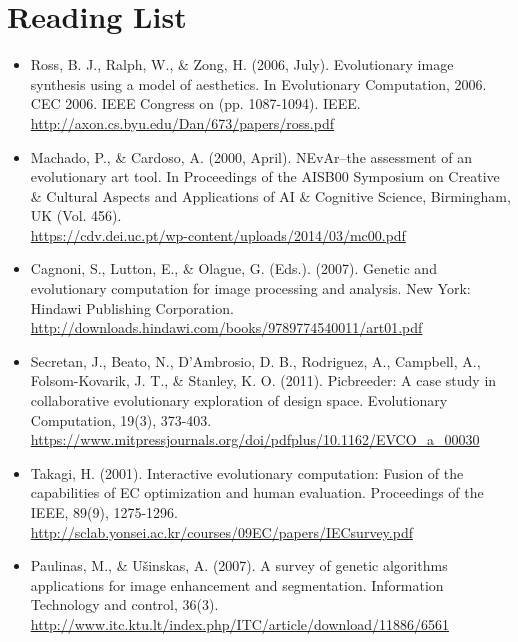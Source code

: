 \documentclass[10pt,a4paper]{article}
\begin{document}
\section{Reading List}
\begin{itemize}
	\item Ross, B. J., Ralph, W., \& Zong, H. (2006, July). Evolutionary image synthesis using a model of aesthetics. In Evolutionary Computation, 2006. CEC 2006. IEEE Congress on (pp. 1087-1094). IEEE.
	\\
	\url{http://axon.cs.byu.edu/Dan/673/papers/ross.pdf}
	
	\item Machado, P., \& Cardoso, A. (2000, April). NEvAr–the assessment of an evolutionary art tool. In Proceedings of the AISB00 Symposium on Creative \& Cultural Aspects and Applications of AI \& Cognitive Science, Birmingham, UK (Vol. 456).
	\\
	\url{https://cdv.dei.uc.pt/wp-content/uploads/2014/03/mc00.pdf}
	
	\item Cagnoni, S., Lutton, E., \& Olague, G. (Eds.). (2007). Genetic and evolutionary computation for image processing and analysis. New York: Hindawi Publishing Corporation.
	\\
	\url{http://downloads.hindawi.com/books/9789774540011/art01.pdf}
	
	\item Secretan, J., Beato, N., D'Ambrosio, D. B., Rodriguez, A., Campbell, A., Folsom-Kovarik, J. T., \& Stanley, K. O. (2011). Picbreeder: A case study in collaborative evolutionary exploration of design space. Evolutionary Computation, 19(3), 373-403.
	\\
	\url{https://www.mitpressjournals.org/doi/pdfplus/10.1162/EVCO_a_00030}
	
	\item Takagi, H. (2001). Interactive evolutionary computation: Fusion of the capabilities of EC optimization and human evaluation. Proceedings of the IEEE, 89(9), 1275-1296.
	\\
	\url{http://sclab.yonsei.ac.kr/courses/09EC/papers/IECsurvey.pdf}
	
	\item Paulinas, M., \& Ušinskas, A. (2007). A survey of genetic algorithms applications for image enhancement and segmentation. Information Technology and control, 36(3).
	\\
	\url{http://www.itc.ktu.lt/index.php/ITC/article/download/11886/6561}
	

\end{itemize}
\end{document}
